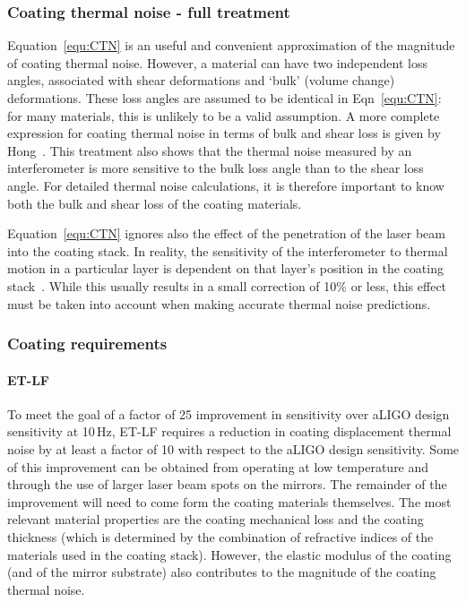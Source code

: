 \subsubsection{Coating thermal noise - full treatment}

Equation~\ref{equ:CTN} is an useful and convenient approximation of the magnitude of coating thermal noise. However, a material can have two independent loss angles, associated with shear deformations and `bulk' (volume change) deformations. These loss angles are assumed to be identical in Eqn~\ref{equ:CTN}: for many materials, this is unlikely to be a valid assumption. A more complete expression for coating thermal noise in terms of bulk and shear loss is given by Hong~\cite{Hong2013}. This treatment also shows that the thermal noise measured by an interferometer is more sensitive to the bulk loss angle than to the shear loss angle. For detailed thermal noise calculations, it is therefore important to know both the bulk and shear loss of the coating materials.

Equation~\ref{equ:CTN} ignores also the effect of the penetration of the laser beam into the coating stack. In reality, the sensitivity of the interferometer to thermal motion in a particular layer is dependent on that layer's position in the coating stack~\cite{Hong2013,gurkowski2010,gorodetsky2008,kondratiev2011}. While this usually results in a small correction of 10$\%$ or less, this effect must be taken into account when making accurate thermal noise predictions.

\subsubsection{Coating requirements}

\paragraph{ET-LF}
To meet the goal of a factor of 25 improvement in sensitivity over aLIGO design sensitivity at 10\,Hz, ET-LF requires a reduction in coating displacement thermal noise by at least a factor of 10 with respect to the aLIGO design  sensitivity. Some of this improvement can be obtained from operating at low temperature and through the use of larger laser beam spots on the mirrors. The remainder of the improvement will need to come form the coating materials themselves. The most relevant material properties are the coating mechanical loss and the coating thickness (which is determined by the combination of refractive indices of the materials used in the coating stack). However, the elastic modulus of the coating (and of the mirror substrate) also contributes to the magnitude of the coating thermal noise.

